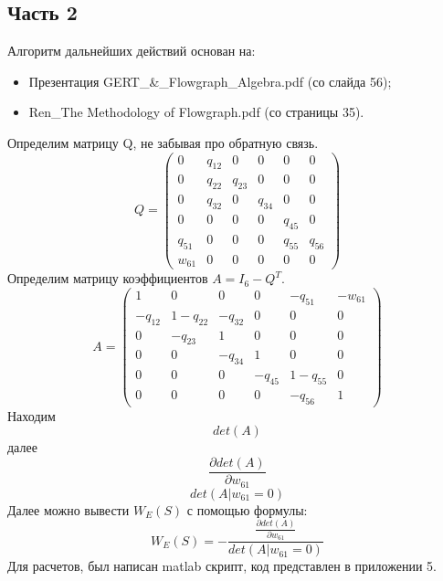 \subsection{Часть 2}
Алгоритм дальнейших действий основан на:
\begin{itemize}
\item Презентация GERT\_\&\_Flowgraph\_Algebra.pdf (со слайда 56);
\item Ren\_The Methodology of Flowgraph.pdf (со страницы 35).
\end{itemize}
Определим матрицу Q, не забывая про обратную связь.
\begin{equation*}
Q = 
 \begin{pmatrix}
  0 & q_{12} & 0 & 0 & 0 & 0 \\
  0 & q_{22} & q_{23} & 0 & 0 & 0 \\ 
  0 & q_{32} & 0 & q_{34} & 0 & 0 \\ 
  0 & 0 & 0 & 0 & q_{45} & 0 \\ 
  q_{51} & 0 & 0 & 0 & q_{55} & q_{56} \\ 
  w_{61} & 0 & 0 & 0 & 0 & 0 
 \end{pmatrix}
\end{equation*}
Определим матрицу коэффициентов $A=I_6-Q^T$.
\begin{equation*}
A = 
 \begin{pmatrix}
    1&       0&    0&    0&    -q_{51}& -w_{61}\\
 -q_{12}& 1 - q_{22}& -q_{32}&    0&       0&    0\\
    0&    -q_{23}&    1&    0&       0&    0\\
    0&       0& -q_{34}&    1&       0&    0\\
    0&       0&    0& -q_{45}& 1 - q_{55}&    0\\
    0&       0&    0&    0&    -q_{56}&    1
 \end{pmatrix}
\end{equation*}
Находим 
\begin{equation*}
det(A)
\end{equation*}
далее
\begin{equation*}
\frac{\partial det(A)}{\partial w_{61}}
\end{equation*}
\begin{equation*}
det(A | w_{61}=0)
\end{equation*}
Далее можно вывести $W_E(S)$ с помощью формулы:
\begin{equation*}
W_E(S)=-\frac{\frac{\partial det(A)}{\partial w_{61}}}{det(A | w_{61}=0)}
\end{equation*}
Для расчетов, был написан matlab скрипт, код представлен в приложении 5.

